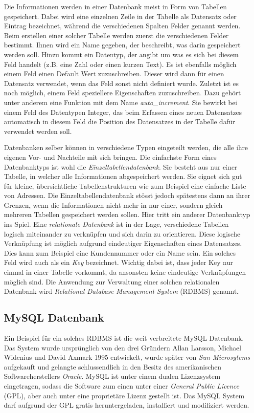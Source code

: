 \documentclass[a4paper,11pt]{report}
\begin{document}
			Die Informationen werden in einer Datenbank meist in Form von Tabellen gespeichert. Dabei wird eine einzelnen Zeile in der Tabelle als Datensatz oder Eintrag bezeichnet, während die verschiedenen Spalten Felder genannt werden. Beim erstellen einer solcher Tabelle werden zuerst die verschiedenen Felder bestimmt. Ihnen wird ein Name gegeben, der beschreibt, was darin gespeichert werden soll. Hinzu kommt ein Datentyp, der angibt um was es sich bei diesem Feld handelt (z.B. eine Zahl oder einen kurzen Text). Es ist ebenfalls möglich einem Feld einen Default Wert zuzuschreiben. Dieser wird dann für einen Datensatz verwendet, wenn das Feld sonst nicht definiert wurde. Zuletzt ist es noch möglich, einem Feld speziellere Eigenschaften zuzuschreiben. Dazu gehört unter anderem eine Funktion mit dem Name \emph{auto\_increment}. Sie bewirkt bei einem Feld des Datentypen Integer, das beim Erfassen eines neuen Datensatzes automatisch in diesem Feld die Position des Datensatzes in der Tabelle dafür verwendet werden soll. 
			
			Datenbanken selber können in verschiedene Typen eingeteilt werden, die alle ihre eigenen Vor- und Nachteile mit sich bringen. Die einfachste Form eines Datenbanktyps ist wohl die \emph{Einzeltabellendatenbank}. Sie besteht aus nur einer Tabelle, in welcher alle Informationen abgespeichert werden. Sie eignet sich gut für kleine, übersichtliche Tabellenstrukturen wie zum Beispiel eine einfache Liste von Adressen. Die Einzeltabellendatenbank stösst jedoch spätestens dann an ihrer Grenzen, wenn die Informationen nicht mehr in nur einer, sondern gleich mehreren Tabellen gespeichert werden sollen. Hier tritt ein anderer Datenbanktyp ins Spiel. Eine \emph{relationale Datenbank} ist in der Lage, verschiedene Tabellen logisch miteinander zu verknüpfen und sich darin zu orientieren. Diese logische Verknüpfung ist möglich aufgrund eindeutiger Eigenschaften eines Datensatzes. Dies kann zum Beispiel eine Kundennummer oder ein Name sein. Ein solches Feld wird auch als ein \emph{Key} bezeichnet. Wichtig dabei ist, dass jeder Key nur einmal in einer Tabelle vorkommt, da ansonsten keine eindeutige Verknüpfungen möglich sind. Die Anwendung zur Verwaltung einer solchen relationalen Datenbank wird \emph{Relational Database Management System} (RDBMS) genannt. \cite[S. 745 - 751]{IT-Handbuch}

				\subsection{MySQL Datenbank}
				Ein Beispiel für ein solches RDBMS ist die weit verbreitete MySQL Datenbank. Das System wurde ursprünglich von den drei Gründern Allan Larsson, Michael Widenius und David Axmark 1995 entwickelt, wurde später von \emph{Sun Microsytems} aufgekauft und gelangte schlussendlich in den Besitz des amerikanischen Softwareherstellers \emph{Oracle}. MySQL ist unter einem dualen Lizenzsystem eingetragen, sodass die Software zum einen unter einer \emph{General Public Licence} (GPL), aber auch unter eine proprietäre Lizenz gestellt ist. \cite{tecmint.com} Das MySQL System darf aufgrund der GPL gratis heruntergeladen, installiert und modifiziert werden.
				
\end{document}
